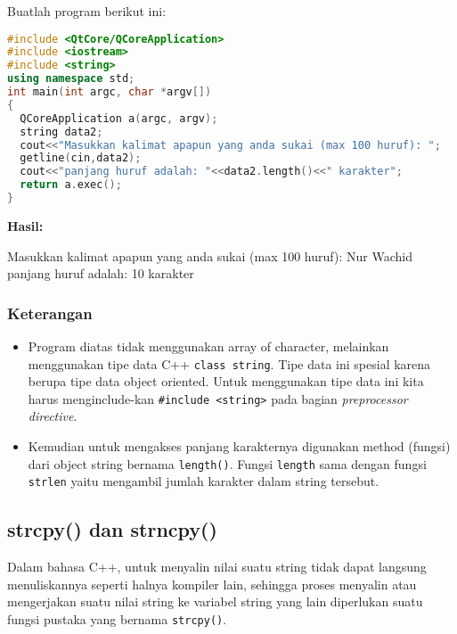 Buatlah program berikut ini:

\begin{lstlisting}[language=c++, caption=Penggunaan fungsi length pada tipe data string C++, label=contoh3-20]
#include <QtCore/QCoreApplication>
#include <iostream>
#include <string>
using namespace std;
int main(int argc, char *argv[])
{
  QCoreApplication a(argc, argv);
  string data2;
  cout<<"Masukkan kalimat apapun yang anda sukai (max 100 huruf): ";
  getline(cin,data2);
  cout<<"panjang huruf adalah: "<<data2.length()<<" karakter";
  return a.exec();
}
\end{lstlisting}

\textbf{Hasil:}

\begin{lcverbatim}
Masukkan kalimat apapun yang anda sukai
(max 100 huruf): Nur Wachid 
panjang huruf adalah: 10 karakter
\end{lcverbatim}
 

\subsubsection*{Keterangan}

\begin{itemize}

\item
  Program diatas tidak menggunakan array of character, melainkan
  menggunakan tipe data C++ \texttt{class\ string}. Tipe data ini
  spesial karena berupa tipe data object oriented. Untuk menggunakan
  tipe data ini kita harus menginclude-kan
  \texttt{\#include\ \textless{}string\textgreater{}} pada bagian
  \emph{preprocessor directive}.
\item
  Kemudian untuk mengakses panjang karakternya digunakan method (fungsi)
  dari object string bernama \texttt{length()}. Fungsi \texttt{length}
  sama dengan fungsi \texttt{strlen} yaitu mengambil jumlah karakter
  dalam string tersebut.
\end{itemize}

\subsection{strcpy() dan strncpy()}\label{strcpy-dan-strncpy}

Dalam bahasa C++, untuk menyalin nilai suatu string tidak dapat langsung
menuliskannya seperti halnya kompiler lain, sehingga proses menyalin
atau mengerjakan suatu nilai string ke variabel string yang lain
diperlukan suatu fungsi pustaka yang bernama \texttt{strcpy()}.

